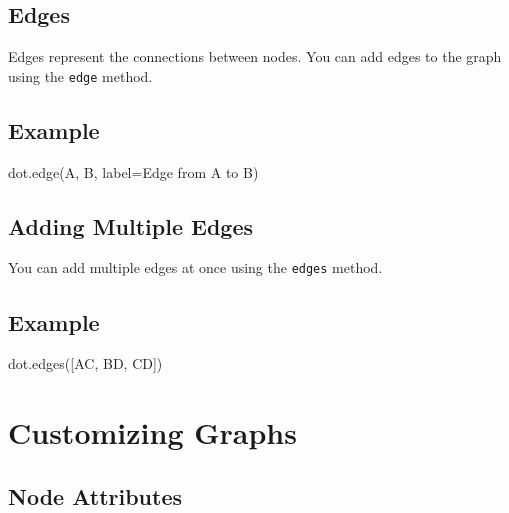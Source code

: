\documentclass[
  letterpaper,
  DIV=11,
  numbers=noendperiod]{scrreprt}
\newenvironment{Shaded}{\begin{snugshade}}{\end{snugshade}}
\newcommand{\NormalTok}[1]{\textcolor[rgb]{0.00,0.23,0.31}{#1}}
\newcommand{\OperatorTok}[1]{\textcolor[rgb]{0.37,0.37,0.37}{#1}}
\newcommand{\StringTok}[1]{\textcolor[rgb]{0.13,0.47,0.30}{#1}}
\begin{document}
\subsection{Edges}\label{edges}

Edges represent the connections between nodes. You can add edges to the
graph using the \texttt{edge} method.

\subsection{Example}\label{example-42}

\begin{Shaded}
\begin{Highlighting}[]
\NormalTok{dot.edge(}\StringTok{\textquotesingle{}A\textquotesingle{}}\NormalTok{, }\StringTok{\textquotesingle{}B\textquotesingle{}}\NormalTok{, label}\OperatorTok{=}\StringTok{\textquotesingle{}Edge from A to B\textquotesingle{}}\NormalTok{)}
\end{Highlighting}
\end{Shaded}

\subsection{Adding Multiple Edges}\label{adding-multiple-edges}

You can add multiple edges at once using the \texttt{edges} method.

\subsection{Example}\label{example-43}

\begin{Shaded}
\begin{Highlighting}[]
\NormalTok{dot.edges([}\StringTok{\textquotesingle{}AC\textquotesingle{}}\NormalTok{, }\StringTok{\textquotesingle{}BD\textquotesingle{}}\NormalTok{, }\StringTok{\textquotesingle{}CD\textquotesingle{}}\NormalTok{])}
\end{Highlighting}
\end{Shaded}

\section{Customizing Graphs}\label{customizing-graphs-1}

\subsection{Node Attributes}\label{node-attributes}
\end{document}
